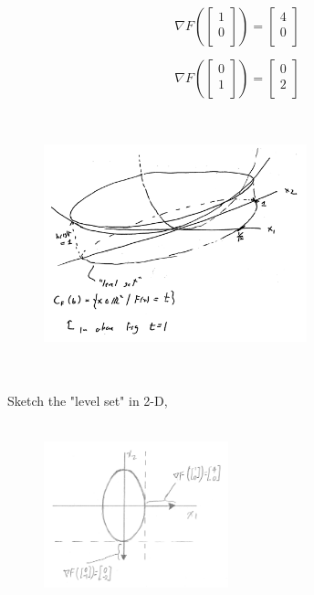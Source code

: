 \begin{displaymath}
\nabla F \left( \begin{bmatrix} 1\\ 0\\ \end{bmatrix} \right)  =
\begin{bmatrix} 4\\ 0\\ \end{bmatrix}
\end{displaymath}

\begin{displaymath}
\nabla F \left( \begin{bmatrix} 0\\ 1\\ \end{bmatrix} \right)  =
\begin{bmatrix} 0\\ 2\\ \end{bmatrix}
\end{displaymath}


\begin{figure}
	\centering
	\includegraphics[width=3in,height=3in]{figures/ch02/p59.jpg}
\end{figure}

Sketch the "level set" in 2-D, 

\begin{figure}
	\centering
	\includegraphics[width=2.1in,height=2.1in]{figures/ch02/p60-1.jpg}
\end{figure}

